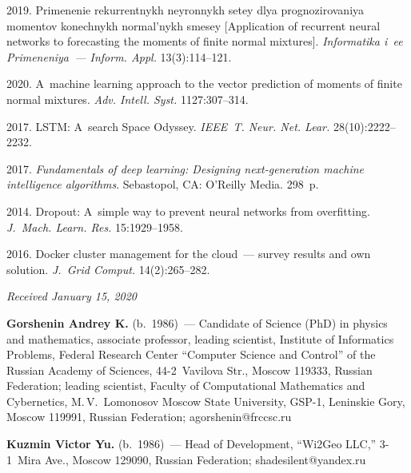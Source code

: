 \begin{multicols}{2}
{{\begin{thebibliography}{99}
 2019. 
Primenenie rekurrentnykh neyronnykh setey dlya prognozirovaniya 
momentov konechnykh normal'nykh smesey [Application of recurrent neural 
networks to forecasting the moments of finite normal mixtures]. 
\textit{Informatika i~ee Primeneniya~--- Inform. Appl.} 13(3):114--121.

 2020. 
A~machine learning approach to the vector prediction of moments of 
finite normal mixtures. \textit{Adv. Intell. Syst.} 
1127:307--314.

  2017. LSTM: A~search Space Odyssey. 
\textit{IEEE~T. Neur. Net. Lear.} 28(10):2222--2232.

 2017. \textit{Fundamentals of deep learning: 
Designing next-generation machine intelligence algorithms}. 
Sebastopol, CA: O'Reilly Media. 298~p.

 2014. Dropout: A~simple way to prevent neural networks from overfitting.
 \textit{J.~Mach. Learn. Res.} 15:1929--1958.

 2016. Docker cluster management for the cloud~--- 
 survey results and own solution. \textit{J.~Grid Comput.} 14(2):265--282.
\end{thebibliography}

 }
 }

\end{multicols}

\vspace*{-6pt}

\hfill{\small\textit{Received January 15, 2020}}


\vspace*{-24pt}

\Contr

\vspace*{-2pt}

\noindent
\textbf{Gorshenin Andrey K.} (b.\ 1986)~--- 
Candidate of Science (PhD) in physics and
mathematics, associate professor, leading scientist, Institute of Informatics Problems,
Federal Research Center ``Computer Science and Control'' of the Russian Academy of
Sciences, 44-2~Vavilova Str., Moscow 119333, Russian Federation;  
leading scientist, Faculty of Computational Mathematics and Cybernetics, 
M.\,V.~Lomonosov Moscow State University, GSP-1, Leninskie Gory,
 Moscow 119991, Russian Federation; \mbox{agorshenin@frccsc.ru}


\noindent
\textbf{Kuzmin Victor Yu.} (b.\ 1986)~--- 
Head of Development, ``Wi2Geo LLC,'' 3-1~Mira
Ave., Moscow 129090, Russian Federation; \mbox{shadesilent@yandex.ru}

\label{end\stat}

\renewcommand{\bibname}{\protect\rm Литература} 
      